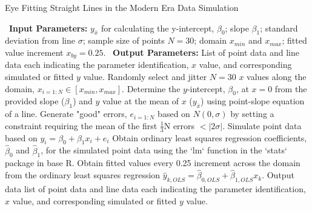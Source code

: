 \documentclass[print]{nuthesis}
\begin{document}
\begin{algorithm}
  \caption{Eye Fitting Straight Lines in the Modern Era Data Simulation}\label{alg:eyefitting-algorithm}
  \begin{algorithmic}[1]
    \Statex \textbullet~\textbf{Input Parameters:} $y_{\bar{x}}$ for calculating the y-intercept, $\beta_0$; slope $\beta_1$; standard deviation from line $\sigma$; sample size of points $N = 30$; domain $x_{min}$ and $x_{max}$; fitted value increment $x_{by} = 0.25$.
    \Statex \textbullet~\textbf{Output Parameters:} List of point data and line data each indicating the parameter identification, $x$ value, and corresponding simulated or fitted $y$ value.
    \State Randomly select and jitter $N = 30$ $x$ values along the domain, $x_{i=1:N}\in [x_{min}, x_{max}]$.
    \State Determine the $y$-intercept, $\beta_0$, at $x = 0$ from the provided slope ($\beta_1$) and $y$ value at the mean of $x$ ($y_{\bar{x}}$) using point-slope equation of a line.
    \State Generate "good" errors, $e_{i = 1:N}$ based on $N(0,\sigma)$ by setting a constraint requiring the mean of the first $\frac{1}{3}\text{N}$ errors $< |2\sigma|.$
    \State Simulate point data based on $y_i = \beta_0 + \beta_1 x_i + e_i$
    \State Obtain ordinary least squares regression coefficients, $\hat\beta_0$ and $\hat\beta_1$, for the simulated point data using the `lm` function in the `stats` package in base R.
    \State Obtain fitted values every 0.25 increment across the domain from the ordinary least squares regression $\hat y_{k,OLS} = \hat\beta_{0,OLS} + \hat\beta_{1,OLS} x_k$.
    \State Output data list of point data and line data each indicating the parameter identification, $x$ value, and corresponding simulated or fitted $y$ value.
  \end{algorithmic}
\end{algorithm}
\end{document}
